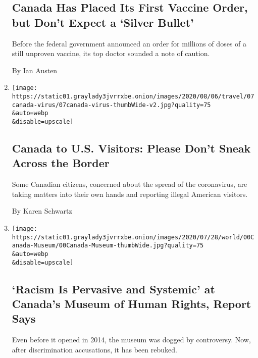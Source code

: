 \begin{enumerate}
  \hypertarget{canada-has-placed-its-first-vaccine-order-but-dont-expect-a-silver-bullet}{%
  \subsection{Canada Has Placed Its First Vaccine Order, but Don't
  Expect a `Silver
  Bullet'}\label{canada-has-placed-its-first-vaccine-order-but-dont-expect-a-silver-bullet}}

  Before the federal government announced an order for millions of doses
  of a still unproven vaccine, its top doctor sounded a note of caution.

  By Ian Austen
\item
  \href{/2020/08/07/travel/Canada-border-crossings-coronavirus.html}{}

  \texttt{[image: https://static01.graylady3jvrrxbe.onion/images/2020/08/06/travel/07canada-virus/07canada-virus-thumbWide-v2.jpg?quality=75\\\&auto=webp\\\&disable=upscale]}

  \hypertarget{canada-to-us-visitors-please-dont-sneak-across-the-border}{%
  \subsection{Canada to U.S. Visitors: Please Don't Sneak Across the
  Border}\label{canada-to-us-visitors-please-dont-sneak-across-the-border}}

  Some Canadian citizens, concerned about the spread of the coronavirus,
  are taking matters into their own hands and reporting illegal American
  visitors.

  By Karen Schwartz
\item
  \href{/2020/08/06/world/canada/museum-of-human-rights-discrimination.html}{}

  \texttt{[image: https://static01.graylady3jvrrxbe.onion/images/2020/07/28/world/00Canada-Museum/00Canada-Museum-thumbWide.jpg?quality=75\\\&auto=webp\\\&disable=upscale]}

  \hypertarget{racism-is-pervasive-and-systemic-at-canadas-museum-of-human-rights-report-says}{%
  \subsection{`Racism Is Pervasive and Systemic' at Canada's Museum of
  Human Rights, Report
  Says}\label{racism-is-pervasive-and-systemic-at-canadas-museum-of-human-rights-report-says}}

  Even before it opened in 2014, the museum was dogged by controversy.
  Now, after discrimination accusations, it has been rebuked.


\end{enumerate}
